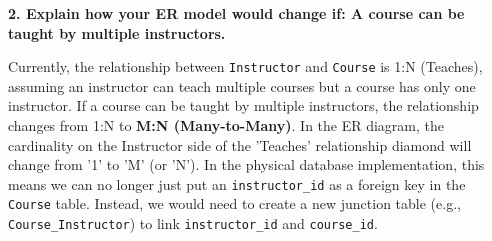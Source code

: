 \documentclass[12pt,a4paper]{article}
\begin{document}
\vspace{0.5cm}

\textbf{2. Explain how your ER model would change if: A course can be taught by multiple instructors.}

Currently, the relationship between \texttt{Instructor} and \texttt{Course} is 1:N (Teaches), assuming an instructor can teach multiple courses but a course has only one instructor.
If a course can be taught by multiple instructors, the relationship changes from 1:N to \textbf{M:N (Many-to-Many)}. 
In the ER diagram, the cardinality on the Instructor side of the 'Teaches' relationship diamond will change from '1' to 'M' (or 'N'). In the physical database implementation, this means we can no longer just put an \texttt{instructor\_id} as a foreign key in the \texttt{Course} table. Instead, we would need to create a new junction table (e.g., \texttt{Course\_Instructor}) to link \texttt{instructor\_id} and \texttt{course\_id}.
\end{document}

